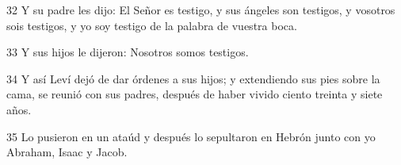 \par 32 Y su padre les dijo: El Señor es testigo, y sus ángeles son testigos, y vosotros sois testigos, y yo soy testigo de la palabra de vuestra boca.

\par 33 Y sus hijos le dijeron: Nosotros somos testigos.

\par 34 Y así Leví dejó de dar órdenes a sus hijos; y extendiendo sus pies sobre la cama, se reunió con sus padres, después de haber vivido ciento treinta y siete años.

\par 35 Lo pusieron en un ataúd y después lo sepultaron en Hebrón junto con yo Abraham, Isaac y Jacob.


